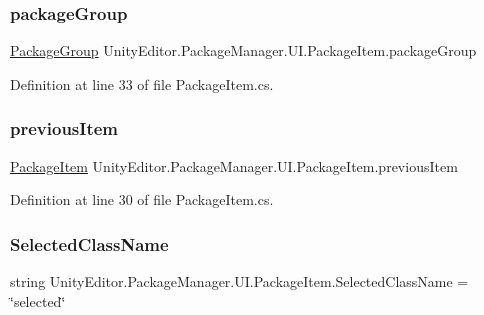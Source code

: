 \subsubsection{\texorpdfstring{packageGroup}{packageGroup}}
{\footnotesize\ttfamily \mbox{\hyperlink{class_unity_editor_1_1_package_manager_1_1_u_i_1_1_package_group}{Package\+Group}} Unity\+Editor.\+Package\+Manager.\+U\+I.\+Package\+Item.\+package\+Group}



Definition at line 33 of file Package\+Item.\+cs.

\mbox{\label{class_unity_editor_1_1_package_manager_1_1_u_i_1_1_package_item_a195630cf7aa560a6bf6573fa6c86fbe0}} 
\subsubsection{\texorpdfstring{previousItem}{previousItem}}
{\footnotesize\ttfamily \mbox{\hyperlink{class_unity_editor_1_1_package_manager_1_1_u_i_1_1_package_item}{Package\+Item}} Unity\+Editor.\+Package\+Manager.\+U\+I.\+Package\+Item.\+previous\+Item}



Definition at line 30 of file Package\+Item.\+cs.

\mbox{\label{class_unity_editor_1_1_package_manager_1_1_u_i_1_1_package_item_a375a4d142d6f61dc5432082910189072}} 
\subsubsection{\texorpdfstring{SelectedClassName}{SelectedClassName}}
{\footnotesize\ttfamily string Unity\+Editor.\+Package\+Manager.\+U\+I.\+Package\+Item.\+Selected\+Class\+Name = \char`\"{}selected\char`\"{}\hspace{0.3cm}{\ttfamily [static]}}



